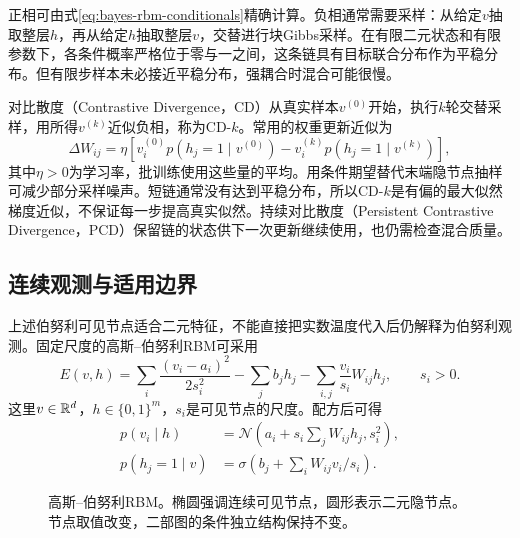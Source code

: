 正相可由式\eqref{eq:bayes-rbm-conditionals}精确计算。负相通常需要采样：从给定$v$抽取整层$h$，再从给定$h$抽取整层$v$，交替进行块Gibbs采样。在有限二元状态和有限参数下，各条件概率严格位于零与一之间，这条链具有目标联合分布作为平稳分布。但有限步样本未必接近平稳分布，强耦合时混合可能很慢。

对比散度（Contrastive Divergence，CD）从真实样本$v^{(0)}$开始，执行$k$轮交替采样，用所得$v^{(k)}$近似负相，称为CD-$k$。常用的权重更新近似为
\begin{equation}
 \Delta W_{ij}=\eta\left[
 v_i^{(0)}p(h_j=1\mid v^{(0)})
 -v_i^{(k)}p(h_j=1\mid v^{(k)})\right],
\end{equation}
其中$\eta>0$为学习率，批训练使用这些量的平均。用条件期望替代末端隐节点抽样可减少部分采样噪声。短链通常没有达到平稳分布，所以CD-$k$是有偏的最大似然梯度近似，不保证每一步提高真实似然。持续对比散度（Persistent Contrastive Divergence，PCD）保留链的状态供下一次更新继续使用，也仍需检查混合质量。

\subsection{连续观测与适用边界}
上述伯努利可见节点适合二元特征，不能直接把实数温度代入后仍解释为伯努利观测。固定尺度的高斯--伯努利RBM可采用
\begin{equation}
 E(v,h)=\sum_i\frac{(v_i-a_i)^2}{2s_i^2}
 -\sum_jb_jh_j-\sum_{i,j}\frac{v_i}{s_i}W_{ij}h_j,
 \qquad s_i>0.
\end{equation}
这里$v\in\mathbb{R}^d$，$h\in\{0,1\}^m$，$s_i$是可见节点的尺度。配方后可得
\begin{align}
 p(v_i\mid h)&=\mathcal N\left(a_i+s_i\sum_jW_{ij}h_j,s_i^2\right),\\
 p(h_j=1\mid v)&=\sigma\left(b_j+\sum_iW_{ij}v_i/s_i\right).
\end{align}
\begin{figure}[htbp]
\centering
{}
\caption{高斯--伯努利RBM。椭圆强调连续可见节点，圆形表示二元隐节点。节点取值改变，二部图的条件独立结构保持不变。}
\label{fig:bayes-gaussian-rbm}
\end{figure}

